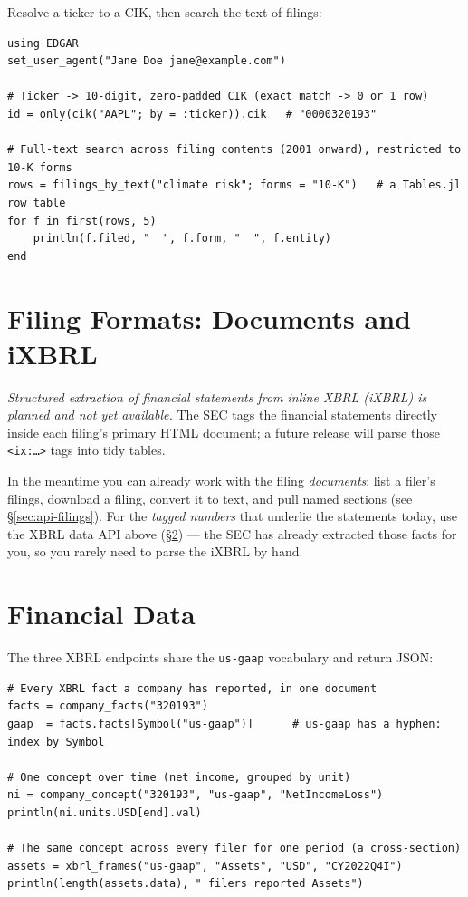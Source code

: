 \documentclass[11pt,a4paper]{report}
\begin{document}
Resolve a ticker to a CIK, then search the text of filings:

\begin{lstlisting}
using EDGAR
set_user_agent("Jane Doe jane@example.com")

# Ticker -> 10-digit, zero-padded CIK (exact match -> 0 or 1 row)
id = only(cik("AAPL"; by = :ticker)).cik   # "0000320193"

# Full-text search across filing contents (2001 onward), restricted to 10-K forms
rows = filings_by_text("climate risk"; forms = "10-K")   # a Tables.jl row table
for f in first(rows, 5)
    println(f.filed, "  ", f.form, "  ", f.entity)
end
\end{lstlisting}


\section{Filing Formats: Documents and iXBRL}
\label{sec:qs-reports}

\emph{Structured extraction of financial statements from inline XBRL (iXBRL) is
planned and not yet available.} The SEC tags the financial statements directly
inside each filing's primary HTML document; a future release will parse those
\texttt{<ix:\dots>} tags into tidy tables.

In the meantime you can already work with the filing \emph{documents}: list a
filer's filings, download a filing, convert it to text, and pull named sections
(see \S\ref{sec:api-filings}). For the \emph{tagged numbers} that underlie the
statements today, use the XBRL data API above (\S\ref{sec:qs-findata}) --- the
SEC has already extracted those facts for you, so you rarely need to parse the
iXBRL by hand.


\section{Financial Data}
\label{sec:qs-findata}

The three XBRL endpoints share the \texttt{us-gaap} vocabulary and return JSON:

\begin{lstlisting}
# Every XBRL fact a company has reported, in one document
facts = company_facts("320193")
gaap  = facts.facts[Symbol("us-gaap")]      # us-gaap has a hyphen: index by Symbol

# One concept over time (net income, grouped by unit)
ni = company_concept("320193", "us-gaap", "NetIncomeLoss")
println(ni.units.USD[end].val)

# The same concept across every filer for one period (a cross-section)
assets = xbrl_frames("us-gaap", "Assets", "USD", "CY2022Q4I")
println(length(assets.data), " filers reported Assets")
\end{lstlisting}
\end{document}
